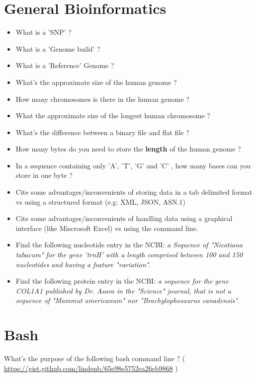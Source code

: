 \documentclass{article}
\begin{document}
%

\section{General Bioinformatics}
\begin{itemize}
\item What is a 'SNP' ? 
\item What is a 'Genome build' ?
\item What is a 'Reference' Genome ?
\item What's the approximate size of the human genome ?
\item How many chromosomes is there in the human genome ?
\item What the approximate size of the longest human chromosome ?
\item What's the difference between a binary file and flat file ?
\item How many bytes do you need to store the \textbf{length} of the human genome ?
\item In a sequence containing only 'A', 'T', 'G' and 'C' , how many bases can you store in one byte ?
\item Cite some advantages/inconvenients of storing data in a tab delimited format vs using a structured format (e.g: XML, JSON, ASN.1)
\item Cite some advantages/inconvenients of handling data using a graphical interface (like Miscrosoft Excel) vs using the command line.
\item Find the following nucleotide entry in the NCBI:\emph{ a Sequence of "Nicotiana tabacum" for the gene 'trnH' with a length comprised between 100 and 150 nucleotides and having a feature "variation"}.
\item Find the following protein entry in the NCBI:\emph{ a sequence for the gene COL1A1 published by Dr. Asara in the "Science" journal,  that is not a sequence of "Mammut americanum" nor "Brachylophosaurus canadensis"}.
\end{itemize}

\section{Bash}
\noindent
What's the purpose of the following bash command line ? ( \url{https://gist.github.com/lindenb/65e98e5752ea26eb9868} )
\end{document}
